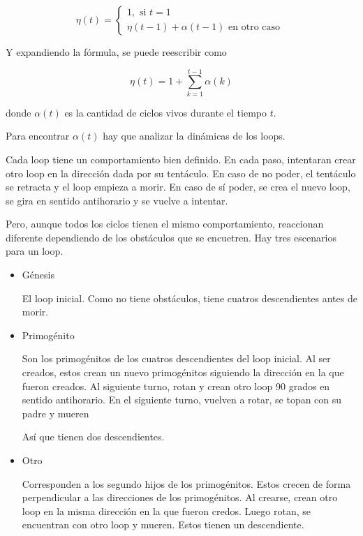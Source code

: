 \documentclass{article}
\begin{document}
\begin{equation*}
  \eta(t) = \begin{cases}
    1, \text{ si }t = 1 \\
    \eta(t-1) + \alpha(t-1) \text{ en otro caso }
  \end{cases}
\end{equation*}

Y expandiendo la fórmula, se puede reescribir como

\begin{equation}
\label{eq:langton-n}
  \eta(t) = 1 + \sum_{k = 1}^{t-1}{\alpha(k)}
\end{equation}

donde $\alpha(t)$ es la cantidad de ciclos vivos durante el tiempo $t$.

Para encontrar $\alpha(t)$ hay que analizar la dinámicas de los loops.

Cada loop tiene un comportamiento bien definido. En cada paso, intentaran crear
otro loop en la dirección dada por su tentáculo. En caso de no poder, el
tentáculo se retracta y el loop empieza a morir. En caso de sí poder, se crea el
nuevo loop, se gira en sentido antihorario y se vuelve a intentar.

Pero, aunque todos los ciclos tienen el mismo comportamiento, reaccionan
diferente dependiendo de los obstáculos que se encuetren. Hay tres escenarios
para un loop.

\begin{itemize}
  \item Génesis

    El loop inicial. Como no tiene obstáculos, tiene cuatros descendientes antes
    de morir.

  \item Primogénito

    Son los primogénitos de los cuatros descendientes del loop inicial. Al ser
    creados, estos crean un nuevo primogénitos siguiendo la dirección en la que
    fueron creados. Al siguiente turno, rotan y crean otro loop 90 grados en
    sentido antihorario. En el siguiente turno, vuelven a rotar, se topan con su
    padre y mueren

    Así que tienen dos descendientes.

  \item Otro

    Corresponden a los segundo hijos de los primogénitos. Estos crecen de forma
    perpendicular a las direcciones de los primogénitos. Al crearse, crean otro
    loop en la misma dirección en la que fueron credos. Luego rotan, se
    encuentran con otro loop y mueren. Estos tienen un descendiente.

\end{itemize}
\end{document}
